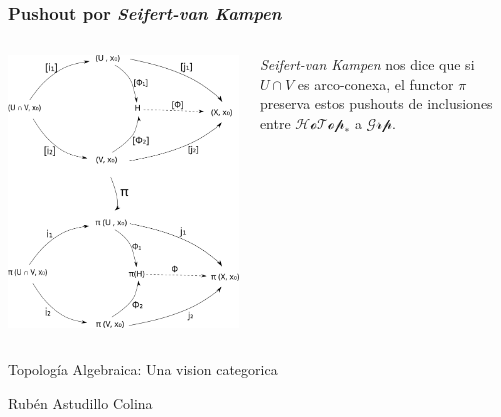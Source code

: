 \documentclass[xetex,mathserif,serif]{beamer}
\newcommand{\vank}{\emph{Seifert-van Kampen} }
\begin{document}
  \begin{frame}
    \frametitle{Pushout por \vank}
    \begin{columns}
      \begin{column}{0.6\textwidth}
        \begin{flushleft}
          \includegraphics[scale=0.33]{../tesis/imagenes/pushoutHotop.png}
        \end{flushleft}
      \end{column}
      \begin{column}{0.4\textwidth}
        \begin{block}{}
          \vank nos dice que si \(U \cap V\) es arco-conexa, el functor
          \(\pi\) preserva estos pushouts de inclusiones entre
          \(\mathscr{HoTop}_*\) a \(\mathscr{Grp}\).
        \end{block}
      \end{column}
    \end{columns}
  \end{frame}
  \begin{frame}
    \begin{block}{}
      \centering
      Topología Algebraica: Una vision categorica
    \end{block}
    \begin{block}{}
      \centering
      Rubén Astudillo Colina
    \end{block}

  \end{frame}
\end{document}
